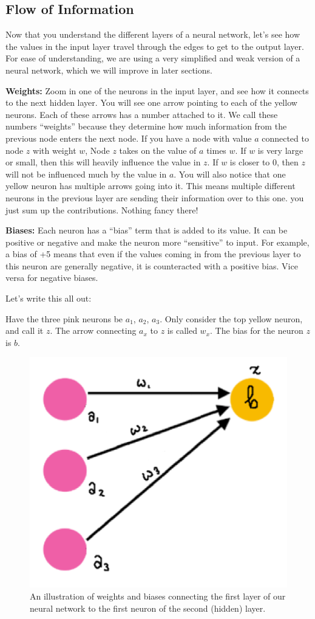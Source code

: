 \subsection{Flow of Information}
    \large Now that you understand the different layers of a neural network, let's see how the values in the input layer travel through the edges to get to the output layer. For ease of understanding, we are using a very simplified and weak version of a neural network, which we will improve in later sections. 
    
    \textbf{Weights:} Zoom in one of the neurons in the input layer, and see how it connects to the next hidden layer. You will see one arrow pointing to each of the yellow neurons. Each of these arrows has a number attached to it. We call these numbers ``weights'' because they determine how much information from the previous node enters the next node. If you have a node with value $a$ connected to node $z$ with weight $w$, Node $z$ takes on the value of $a$ times $w$. If $w$ is very large or small, then this will heavily influence the value in $z$. If $w$ is closer to 0, then $z$ will not be influenced much by the value in $a$. You will also notice that one yellow neuron has multiple arrows going into it. This means multiple different neurons in the previous layer are sending their information over to this one. you just sum up the contributions. Nothing fancy there! 
    
    \textbf{Biases:} Each neuron has a ``bias'' term that is added to its value. It can be positive or negative and make the neuron more ``sensitive'' to input. For example, a bias of +5 means that even if the values coming in from the previous layer to this neuron are generally negative, it is counteracted with a positive bias. Vice versa for negative biases. 
    
    Let's write this all out: 
    
    Have the three pink neurons be $a_1$, $a_2$, $a_3$. Only consider the top yellow neuron, and call it $z$. The arrow connecting $a_x$ to $z$ is called $w_x$. The bias for the neuron $z$ is $b$. 

    \begin{figure}[H]
        \centering
        \includegraphics[width=0.5\linewidth]{dl/connectivity_basic.png}
        \caption{An illustration of weights and biases connecting the first layer of our neural network to the first neuron of the second (hidden) layer.}
        \label{fig:connectivity_basic}
    \end{figure}

